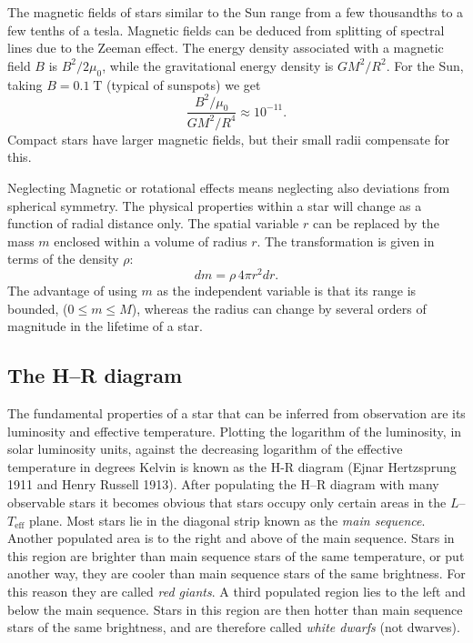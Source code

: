 \documentclass[]{article}
\newcommand{\unit}[1]{\;\mathrm{#1}}
\begin{document}
\begin{description}
The magnetic fields of stars similar to the Sun range from a few thousandths to
a few tenths of a tesla. Magnetic fields can be deduced from splitting of
spectral lines due to the Zeeman effect. The energy density associated with a
magnetic field $B$ is $B^2/2\mu_0$, while the gravitational energy density is
$GM^2/R^2$. For the Sun, taking $B=0.1\unit{T}$ (typical of sunspots) we get
\begin{equation*}
\frac{B^2/\mu_0}{GM^2/R^4}\approx10^{-11}.
\end{equation*}
Compact stars have larger magnetic fields, but their small radii compensate for
this.

Neglecting Magnetic or rotational effects means neglecting also deviations from
spherical symmetry. The physical properties within a star will change as a
function of radial distance only. The spatial variable $r$ can be replaced by
the mass $m$ enclosed within a volume of radius $r$. The transformation is given
in terms of the density $\rho$:
\begin{equation}
dm=\rho\,4\pi{r}^2dr.
\end{equation}
The advantage of using $m$ as the independent variable is that its range is
bounded, ($0\leq{m}\leq{M}$), whereas the radius can change by several orders of
magnitude in the lifetime of a star.

\end{description}

\subsection{The H--R diagram}
The fundamental properties of a star that can be inferred from observation are
its luminosity and effective temperature. Plotting the logarithm of the
luminosity, in solar luminosity units, against the decreasing logarithm of the
effective temperature in degrees Kelvin is known as the H-R diagram (Ejnar
Hertzsprung 1911 and Henry Russell 1913). After populating the H--R diagram with
many observable stars it becomes obvious that stars occupy only certain areas in
the $L$--$T_\text{eff}$ plane. Most stars lie in the diagonal strip known as the
\emph{main sequence}. Another populated area is to the right and above of the
main sequence. Stars in this region are brighter than main sequence stars of the
same temperature, or put another way, they are cooler than main sequence stars
of the same brightness. For this reason they are called \emph{red giants}. A
third populated region lies to the left and below the main sequence. Stars in
this region are then hotter than main sequence stars of the same brightness, and
are therefore called \emph{white dwarfs} (not dwarves).
\end{document}
